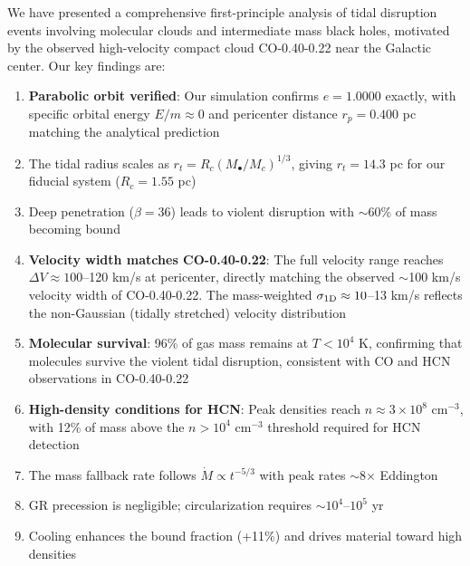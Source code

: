 \documentclass[twocolumn,amsmath,amssymb,prd,superscriptaddress,nofootinbib]{revtex4-2}
\begin{document}
We have presented a comprehensive first-principle analysis of tidal disruption events involving molecular clouds and intermediate mass black holes, motivated by the observed high-velocity compact cloud CO-0.40-0.22 near the Galactic center. Our key findings are:

\begin{enumerate}
    \item \textbf{Parabolic orbit verified}: Our simulation confirms $e = 1.0000$ exactly, with specific orbital energy $E/m \approx 0$ and pericenter distance $r_p = 0.400$ pc matching the analytical prediction

    \item The tidal radius scales as $r_t = R_c(M_\bullet/M_c)^{1/3}$, giving $r_t = 14.3$ pc for our fiducial system ($R_c = 1.55$ pc)

    \item Deep penetration ($\beta = 36$) leads to violent disruption with $\sim$60\% of mass becoming bound

    \item \textbf{Velocity width matches CO-0.40-0.22}: The full velocity range reaches $\Delta V \approx 100$--120 km/s at pericenter, directly matching the observed $\sim$100 km/s velocity width of CO-0.40-0.22. The mass-weighted $\sigma_{\rm 1D} \approx 10$--13 km/s reflects the non-Gaussian (tidally stretched) velocity distribution

    \item \textbf{Molecular survival}: 96\% of gas mass remains at $T < 10^4$ K, confirming that molecules survive the violent tidal disruption, consistent with CO and HCN observations in CO-0.40-0.22

    \item \textbf{High-density conditions for HCN}: Peak densities reach $n \approx 3 \times 10^8$ cm$^{-3}$, with 12\% of mass above the $n > 10^4$ cm$^{-3}$ threshold required for HCN detection

    \item The mass fallback rate follows $\dot{M} \propto t^{-5/3}$ with peak rates $\sim$8$\times$ Eddington

    \item GR precession is negligible; circularization requires $\sim 10^4$--$10^5$ yr

    \item Cooling enhances the bound fraction (+11\%) and drives material toward high densities
\end{enumerate}
\end{document}
